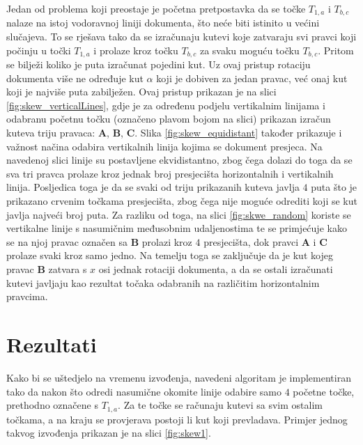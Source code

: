 \documentclass[times, utf8, zavrsni, numeric]{fer}
\begin{document}
Jedan od problema koji preostaje je početna pretpostavka da se točke $T_{1, a}$ i $T_{b, c}$ nalaze na istoj vodoravnoj liniji dokumenta, što neće biti istinito u većini slučajeva.
To se rješava tako da se izračunaju kutevi koje zatvaraju svi pravci koji počinju u točki $T_{1, a}$ i prolaze kroz točku $T_{b, c}$ za svaku moguću točku $T_{b, c}$.
Pritom se bilježi koliko je puta izračunat pojedini kut.
Uz ovaj pristup rotaciju dokumenta više ne određuje kut $\alpha$ koji je dobiven za jedan pravac, već onaj kut koji je najviše puta zabilježen.
Ovaj pristup prikazan je na slici \ref{fig:skew_verticalLines}, gdje je za određenu podjelu vertikalnim linijama i odabranu početnu točku (označeno plavom bojom na slici) prikazan izračun kuteva triju pravaca: \textbf{A}, \textbf{B}, \textbf{C}.
Slika \ref{fig:skew_equidistant} također prikazuje i važnost načina odabira vertikalnih linija kojima se dokument presjeca.
Na navedenoj slici linije su postavljene ekvidistantno, zbog čega dolazi do toga da se sva tri pravca prolaze kroz jednak broj presjecišta horizontalnih i vertikalnih linija.
Posljedica toga je da se svaki od triju prikazanih kuteva javlja $4$ puta što je prikazano crvenim točkama presjecišta, zbog čega nije moguće odrediti koji se kut javlja najveći broj puta.
Za razliku od toga, na slici \ref{fig:skwe_random} koriste se vertikalne linije s nasumičnim međusobnim udaljenostima te se primjećuje kako se na njoj pravac označen sa \textbf{B} prolazi kroz $4$ presjecišta, dok pravci \textbf{A} i \textbf{C} prolaze svaki kroz samo jedno.
Na temelju toga se zaključuje da je kut kojeg pravac \textbf{B} zatvara s $x$ osi jednak rotaciji dokumenta, a da se ostali izračunati kutevi javljaju kao rezultat točaka odabranih na različitim horizontalnim pravcima.

\section{Rezultati}
Kako bi se uštedjelo na vremenu izvođenja, navedeni algoritam je implementiran tako da nakon što odredi nasumične okomite linije odabire samo $4$ početne točke, prethodno označene s $T_{1, a}$.
Za te točke se računaju kutevi sa svim ostalim točkama, a na kraju se provjerava postoji li kut koji prevladava.
Primjer jednog takvog izvođenja prikazan je na slici \ref{fig:skew1}.\\
\end{document}
